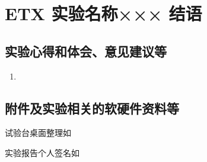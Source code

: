 \documentclass[dvipsnames, svgnames,a4paper,11pt]{article}
\begin{document}
	\begin{question}
		
	\end{question}
	
	
	
	\clearpage
	
	\section{ETX 实验名称××× \quad\heiti 结语}
	
	\subsection{实验心得和体会、意见建议等}
	\begin{enumerate}
		\item 
	\end{enumerate}
	

	\subsection{附件及实验相关的软硬件资料等}
	试验台桌面整理如%
	
	实验报告个人签名如

	
	
\end{document}
